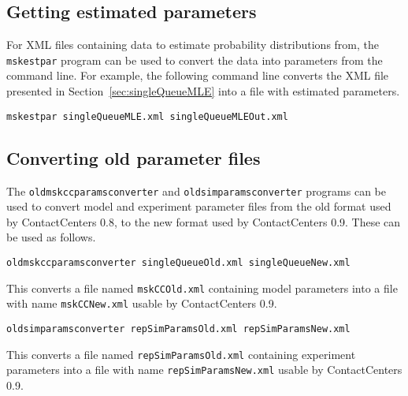 \subsection{Getting estimated parameters}
\label{sec:estparprg}

For XML files containing data to estimate probability distributions
from, the \texttt{mskestpar} program can be used to convert the data
into parameters from the command line.  For example, the following
command line converts the XML file presented in
Section~\ref{sec:singleQueueMLE} into a file with estimated parameters.

\noindent\texttt{mskestpar singleQueueMLE.xml singleQueueMLEOut.xml}

\subsection{Converting old parameter files}

The \texttt{oldmskccparamsconverter} and
\texttt{oldsimparamsconverter} programs can be used
to convert model and experiment parameter files from
the old format used by ContactCenters 0.8, to the new format
used by ContactCenters 0.9.
These can be used as follows.

\noindent\texttt{oldmskccparamsconverter singleQueueOld.xml singleQueueNew.xml}

This converts a file named  \texttt{mskCCOld.xml} containing
model parameters into a file with name
\texttt{mskCCNew.xml} usable by ContactCenters 0.9.

\noindent\texttt{oldsimparamsconverter repSimParamsOld.xml repSimParamsNew.xml}

This converts a file named \texttt{repSimParamsOld.xml} containing
experiment parameters into a file with name
\texttt{repSimParamsNew.xml} usable by ContactCenters 0.9.
